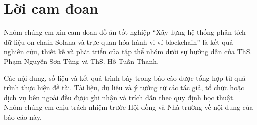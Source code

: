 \chapter*{Lời cam đoan}
\label{reassurances}

Nhóm chúng em xin cam đoan đồ án tốt nghiệp ``Xây dựng hệ thống phân tích dữ liệu on-chain Solana và trực quan hóa hành vi ví blockchain'' là kết quả nghiên cứu, thiết kế và phát triển của tập thể nhóm dưới sự hướng dẫn của ThS. Phạm Nguyễn Sơn Tùng và ThS. Hồ Tuấn Thanh.

Các nội dung, số liệu và kết quả trình bày trong báo cáo được tổng hợp từ quá trình thực hiện đề tài. Tài liệu, dữ liệu và ý tưởng từ các tác giả, tổ chức hoặc dịch vụ bên ngoài đều được ghi nhận và trích dẫn theo quy định học thuật. Nhóm chúng em chịu trách nhiệm trước Hội đồng và Nhà trường về nội dung của báo cáo này.
